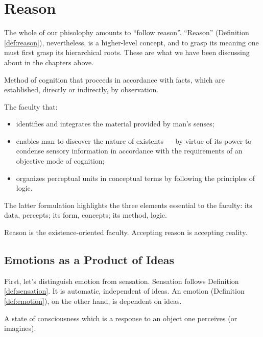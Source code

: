 \chapter{Reason}

    The whole of our phisolophy amounts to ``follow reason''. ``Reason'' (Definition \ref{def:reason}), nevertheless, is a higher-level concept, and to grasp its meaning one must first grasp its hierarchical roots. These are what we have been discussing about in the chapters above.

        \begin{definition}[Reason]
        \label{def:reason}
            Method of cognition that proceeds in accordance with facts, which are established, directly or indirectly, by observation.
            
            The faculty that:
            \begin{itemize}
                \item identifies and integrates the material provided by man's senses;
                \item enables man to discover the nature of existents — by virtue of its power to condense sensory information in accordance with the requirements of an objective mode of cognition;
                \item organizes perceptual units in conceptual terms by following the principles of logic.
            \end{itemize}
        \end{definition}

        \begin{remark}
            The latter formulation highlights the three elements essential to the faculty: its data, percepts; its form, concepts; its method, logic.
        \end{remark}

    Reason is the existence-oriented faculty. Accepting reason is accepting reality.

    \section{Emotions as a Product of Ideas}
    
        First, let's distinguish emotion from sensation. Sensation follows Definition \ref{def:sensation}. It is automatic, independent of ideas. An emotion (Definition \ref{def:emotion}), on the other hand, is dependent on ideas.

            \begin{definition}[Emotion]
            \label{def:emotion}
                A state of consciousness which is a response to an object one perceives (or imagines).
            \end{definition}


